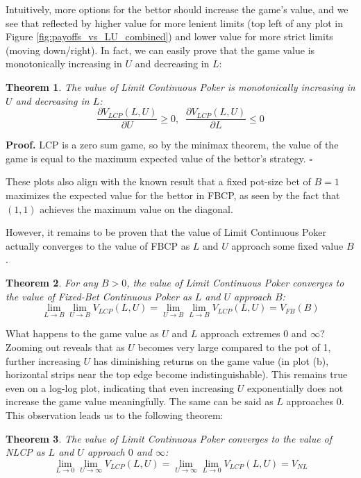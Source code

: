 \documentclass[a4paper,12pt]{article}
\theoremstyle{plain}
\newtheorem{theorem}{Theorem}[section]
\theoremstyle{definition}
\newenvironment{customproof}[1][Proof]{\noindent\textbf{#1.} }{\hfill$\square$\vspace{1em}}
\begin{document}
Intuitively, more options for the bettor should increase the game's value, and we see that reflected by higher value for more lenient limits (top left of any plot in Figure \ref{fig:payoffs_vs_LU_combined}) and lower value for more strict limits (moving down/right). In fact, we can easily prove that the game value is monotonically increasing in $U$ and decreasing in $L$:

\begin{theorem}
    The value of Limit Continuous Poker is monotonically increasing in $U$ and decreasing in $L$:
\[
    \frac{\partial V_{LCP}(L, U)}{\partial U} \geq 0, \;\; \frac{\partial V_{LCP}(L, U)}{\partial L} \leq 0
\]
\end{theorem}
\begin{customproof}
    LCP is a zero sum game, so by the minimax theorem, the value of the game is equal to the maximum expected value of the bettor's strategy. 
\end{customproof}

These plots also align with the known result that a fixed pot-size bet of $B=1$ maximizes the expected value for the bettor in FBCP, as seen by the fact that $(1, 1)$ achieves the maximum value on the diagonal. 

However, it remains to be proven that the value of Limit Continuous Poker actually converges to the value of FBCP as $L$ and $U$ approach some fixed value $B$.

\begin{theorem}
    For any $B > 0$, the value of Limit Continuous Poker converges to the value of Fixed-Bet Continuous Poker as $L$ and $U$ approach $B$:
\[
\lim_{L \to B} \lim_{U \to B} V_{LCP}(L, U) = \lim_{U \to B} \lim_{L \to B} V_{LCP}(L, U) = V_{FB}(B)
\]
\end{theorem}

What happens to the game value as $U$ and $L$ approach extremes $0$ and $\infty$? Zooming out reveals that as $U$ becomes very large compared to the pot of 1, further increasing $U$ has diminishing returns on the game value (in plot (b), horizontal strips near the top edge become indistinguishable). This remains true even on a log-log plot, indicating that even increasing $U$ exponentially does not increase the game value meaningfully. The same can be said as $L$ approaches $0$. This observation leads us to the following theorem:

\begin{theorem}
    The value of Limit Continuous Poker converges to the value of NLCP as $L$ and $U$ approach $0$ and $\infty$:
\[
\lim_{L \to 0} \lim_{U \to \infty} V_{LCP}(L, U) = \lim_{U \to \infty} \lim_{L \to 0} V_{LCP}(L, U) = V_{NL}
\]
\end{theorem}
\end{document}
